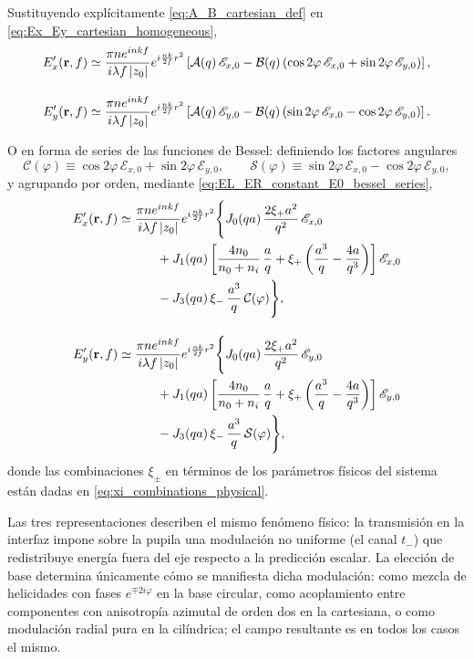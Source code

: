 Sustituyendo explícitamente \eqref{eq:A_B_cartesian_def} en \eqref{eq:Ex_Ey_cartesian_homogeneous},
\begin{equation}
\begin{aligned}
E'_x(\vb r,f)
&\simeq
\frac{\pi n e^{inkf}}{i\lambda f\,|z_0|}
e^{i\frac{nk}{2f}r^2}
\left[
\mathcal A(q)\,\mathscr E_{x,0}
-
\mathcal B(q)
\left(
\cos2\varphi\,\mathscr E_{x,0}
+
\sin2\varphi\,\mathscr E_{y,0}
\right)
\right],
\\[1em]
E'_y(\vb r,f)
&\simeq
\frac{\pi n e^{inkf}}{i\lambda f\,|z_0|}
e^{i\frac{nk}{2f}r^2}
\left[
\mathcal A(q)\,\mathscr E_{y,0}
-
\mathcal B(q)
\left(
\sin2\varphi\,\mathscr E_{x,0}
-
\cos2\varphi\,\mathscr E_{y,0}
\right)
\right].
\end{aligned}
\label{eq:Ex_Ey_cartesian_homogeneous_AB}
\end{equation}

O en forma de series de las funciones de Bessel: definiendo los factores angulares
\begin{equation}
\mathcal C(\varphi)
\equiv
\cos2\varphi\,\mathscr E_{x,0}+\sin2\varphi\,\mathscr E_{y,0},
\qquad
\mathcal S(\varphi)
\equiv
\sin2\varphi\,\mathscr E_{x,0}-\cos2\varphi\,\mathscr E_{y,0},
\label{eq:cartesian_angular_factors}
\end{equation}
y agrupando por orden, mediante \eqref{eq:EL_ER_constant_E0_bessel_series},
\begin{equation}
\begin{aligned}
E'_x(\vb r,f)
\simeq&\;
\frac{\pi n e^{inkf}}{i\lambda f\,|z_0|}
e^{i\frac{nk}{2f}r^2}
\Bigg\{
J_0(qa)\,
\frac{2\xi_+ a^2}{q^2}\,
\mathscr E_{x,0}
\\
&\qquad
+
J_1(qa)
\left[
\frac{4n_0}{n_0+n_i}\,\frac{a}{q}
+
\xi_+
\left(
\frac{a^3}{q}
-
\frac{4a}{q^3}
\right)
\right]
\mathscr E_{x,0}
\\
&\qquad
-
J_3(qa)\,
\xi_-\,\frac{a^3}{q}\,
\mathcal C(\varphi)
\Bigg\},
\\[1em]
E'_y(\vb r,f)
\simeq&\;
\frac{\pi n e^{inkf}}{i\lambda f\,|z_0|}
e^{i\frac{nk}{2f}r^2}
\Bigg\{
J_0(qa)\,
\frac{2\xi_+ a^2}{q^2}\,
\mathscr E_{y,0}
\\
&\qquad
+
J_1(qa)
\left[
\frac{4n_0}{n_0+n_i}\,\frac{a}{q}
+
\xi_+
\left(
\frac{a^3}{q}
-
\frac{4a}{q^3}
\right)
\right]
\mathscr E_{y,0}
\\
&\qquad
-
J_3(qa)\,
\xi_-\,\frac{a^3}{q}\,
\mathcal S(\varphi)
\Bigg\},
\end{aligned}
\label{eq:Ex_Ey_cartesian_bessel_series}
\end{equation}
donde las combinaciones $\xi_\pm$ en términos de los parámetros
físicos del sistema están dadas en \eqref{eq:xi_combinations_physical}.

Las tres representaciones describen el mismo fenómeno físico: la transmisión
en la interfaz impone sobre la pupila una modulación no uniforme (el canal
$t_-$) que redistribuye energía fuera del eje respecto a la predicción
escalar. La elección de base determina únicamente cómo se manifiesta dicha
modulación: como mezcla de helicidades con fases $e^{\mp2i\varphi}$ en la
base circular, como acoplamiento entre componentes con anisotropía azimutal
de orden dos en la cartesiana, o como modulación radial pura en la
cilíndrica; el campo resultante es en todos los casos el mismo.
